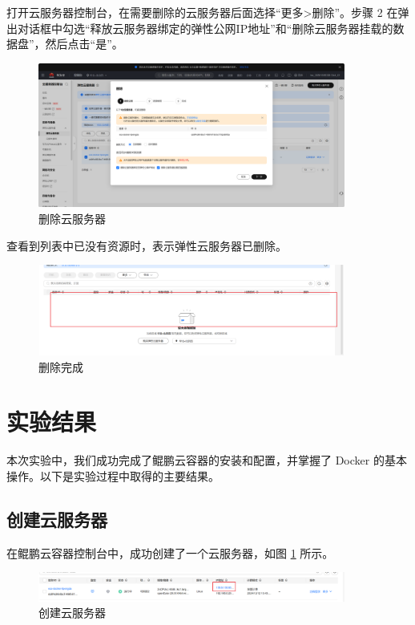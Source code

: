 \documentclass{article}
\begin{document}
打开云服务器控制台，在需要删除的云服务器后面选择“更多>删除”。步骤 2	在弹出对话框中勾选“释放云服务器绑定的弹性公网IP地址”和“删除云服务器挂载的数据盘”，然后点击“是”。

\begin{figure}[H]
\centering
\includegraphics[width=0.9\textwidth]{img/2.8.1.1.png}
\caption{删除云服务器}
\end{figure}

查看到列表中已没有资源时，表示弹性云服务器已删除。

\begin{figure}[H]
\centering
\includegraphics[width=0.9\textwidth]{img/2.8.1.2.png}
\caption{删除完成}
\end{figure}

\section{实验结果}


本次实验中，我们成功完成了鲲鹏云容器的安装和配置，并掌握了 Docker 的基本操作。以下是实验过程中取得的主要结果。

\subsection{创建云服务器}

在鲲鹏云容器控制台中，成功创建了一个云服务器，如图 \ref{fig:create-server} 所示。

\begin{figure}[H]
\centering
\includegraphics[width=0.9\textwidth]{img/0.1.png}
\caption{创建云服务器}
\label{fig:create-server}
\end{figure}
\end{document}
